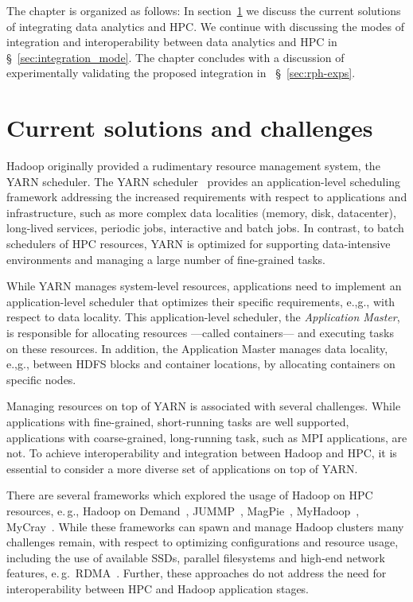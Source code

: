 The chapter is organized as follows: In section~\ref{sec:hpc_hadoop_rel} we discuss the current solutions of integrating data analytics and HPC.
We continue with discussing the modes of integration and interoperability between data analytics and HPC in \S~\ref{sec:integration_mode}.
The chapter concludes with a discussion of experimentally validating the proposed integration in ~\S~\ref{sec:rph-exps}.

\section{Current solutions and challenges}
\label{sec:hpc_hadoop_rel}
Hadoop originally provided a rudimentary resource management system, the YARN scheduler.
The YARN scheduler~\cite{vavilapalli2013apache} provides an application-level scheduling framework addressing the increased requirements with respect to applications and infrastructure, such as more complex data localities (memory, disk, datacenter), long-lived services, periodic jobs, interactive and batch jobs.
In contrast, to batch schedulers of HPC resources, YARN is optimized for supporting data-intensive environments and managing a large number of fine-grained tasks.

While YARN manages system-level resources, applications need to implement an application-level scheduler that optimizes their specific requirements, e.,g., with respect to data locality.
This application-level scheduler, the \textit{Application Master}, is responsible for allocating resources ---called containers---  and executing tasks on these resources.
In addition, the Application Master manages data locality, e.,g., between HDFS blocks and container locations, by allocating containers on specific nodes.

Managing resources on top of YARN is associated with several challenges.
While applications with fine-grained, short-running tasks are well supported, applications with coarse-grained, long-running task, such as MPI applications, are not.
To achieve interoperability and integration between Hadoop and HPC, it is essential to consider a more diverse set of applications on top of YARN.

There are several frameworks which explored the usage of Hadoop on HPC resources, e.\,g., Hadoop on Demand~\cite{hod}, JUMMP~\cite{moody2013jummp}, MagPie~\cite{chu2015magpie}, MyHadoop~\cite{krishnan2011myhadoop}, MyCray~\cite{mycray}.
While these frameworks can spawn and manage Hadoop clusters many challenges remain, with respect to optimizing configurations and resource usage, including the use of available SSDs, parallel filesystems and high-end network features, e.\,g.\ RDMA~\cite{rahman2014homr}.
Further, these approaches do not address the need for interoperability between HPC and Hadoop application stages.

